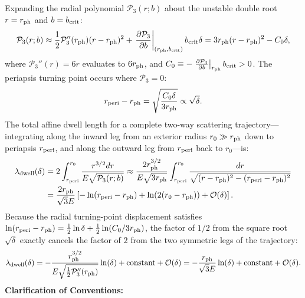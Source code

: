 Expanding the radial polynomial $\mathcal{P}_3(r; b)$ about the unstable double root $r = r_{\rm ph}$ and $b = b_{\rm crit}$:
\begin{equation}
    \mathcal{P}_3(r; b) \approx \frac{1}{2} \mathcal{P}_3''(r_{\rm ph})(r - r_{\rm ph})^2 + \left.\frac{\partial\mathcal{P}_3}{\partial b}\right|_{(r_{\rm ph}, b_{\rm crit})} b_{\rm crit} \delta = 3 r_{\rm ph} (r - r_{\rm ph})^2 - C_0 \delta,
\end{equation}
where $\mathcal{P}_3''(r) = 6r$ evaluates to $6r_{\rm ph}$, and $C_0 \equiv -\left.\frac{\partial\mathcal{P}_3}{\partial b}\right|_{r_{\rm ph}} b_{\rm crit} > 0$. The periapsis turning point occurs where $\mathcal{P}_3 = 0$:
\begin{equation}
    r_{\rm peri} - r_{\rm ph} = \sqrt{\frac{C_0 \delta}{3r_{\rm ph}}} \propto \sqrt{\delta}.
\end{equation}
The total affine dwell length for a complete two-way scattering trajectory---integrating along the inward leg from an exterior radius $r_0 \gg r_{\rm ph}$ down to periapsis $r_{\rm peri}$, and along the outward leg from $r_{\rm peri}$ back to $r_0$---is:
\begin{align}
    \lambda_{\rm dwell}(\delta) &= 2 \int_{r_{\rm peri}}^{r_0} \frac{r^{3/2} dr}{E \sqrt{\mathcal{P}_3(r; b)}} \approx \frac{2 r_{\rm ph}^{3/2}}{E \sqrt{3r_{\rm ph}}} \int_{r_{\rm peri}}^{r_0} \frac{dr}{\sqrt{(r - r_{\rm ph})^2 - (r_{\rm peri} - r_{\rm ph})^2}} \nonumber \\
    &= \frac{2 r_{\rm ph}}{\sqrt{3}E} \left[ -\ln(r_{\rm peri} - r_{\rm ph}) + \ln(2(r_0 - r_{\rm ph})) + \mathcal{O}(\delta) \right].
\end{align}
Because the radial turning-point displacement satisfies $\ln(r_{\rm peri} - r_{\rm ph}) = \frac{1}{2}\ln\delta + \frac{1}{2}\ln(C_0 / 3r_{\rm ph})$, the factor of $1/2$ from the square root $\sqrt{\delta}$ exactly cancels the factor of $2$ from the two symmetric legs of the trajectory:
\begin{equation}
    \lambda_{\rm dwell}(\delta) = -\frac{r_{\rm ph}^{3/2}}{E\sqrt{\frac{1}{2}\mathcal{P}_3''(r_{\rm ph})}} \ln(\delta) + \text{constant} + \mathcal{O}(\delta) = -\frac{r_{\rm ph}}{\sqrt{3}E} \ln(\delta) + \text{constant} + \mathcal{O}(\delta).
    \label{eq:logarithmic_dwell_scaling}
\end{equation}
\noindent \textbf{Clarification of Conventions:}

